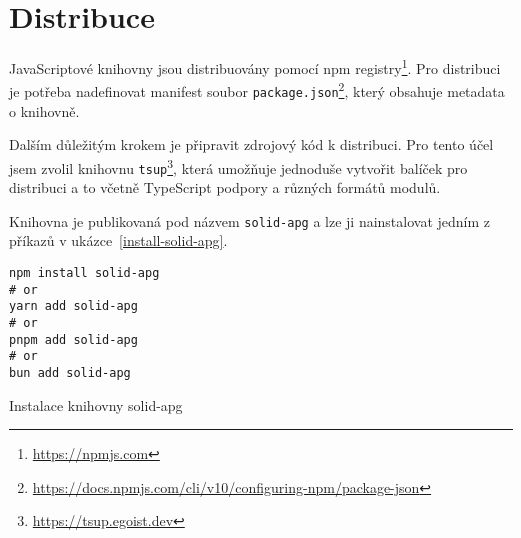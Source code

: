 \section{Distribuce}

JavaScriptové knihovny jsou distribuovány pomocí npm registry\footnote{\url{https://npmjs.com}}.
Pro distribuci je potřeba nadefinovat manifest soubor \texttt{package.json}\footnote{\url{https://docs.npmjs.com/cli/v10/configuring-npm/package-json}}, který obsahuje metadata o knihovně.

Dalším důležitým krokem je připravit zdrojový kód k distribuci.
Pro tento účel jsem zvolil knihovnu \texttt{tsup}\footnote{\url{https://tsup.egoist.dev}}, která umožňuje jednoduše vytvořit balíček pro distribuci a to včetně TypeScript podpory a různých formátů modulů.

Knihovna je publikovaná pod názvem \texttt{solid-apg} a lze ji nainstalovat jedním z příkazů v ukázce~\ref{install-solid-apg}.

\begin{listing}[!ht]
    \begin{verbatim}
npm install solid-apg
# or
yarn add solid-apg
# or 
pnpm add solid-apg
# or
bun add solid-apg
\end{verbatim}
    \caption{Instalace knihovny solid-apg}
    \label{install-solid-apg}
\end{listing}
